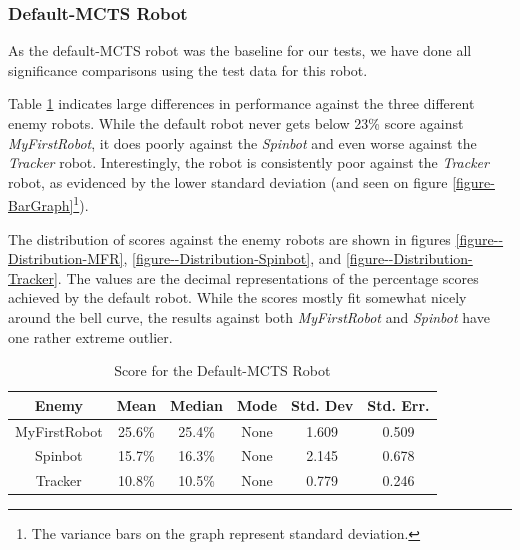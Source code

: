 \subsubsection{Default-MCTS Robot}
As the default-MCTS robot was the baseline for our tests, we have done all significance comparisons using the test data for this robot.

Table \ref{table-default-score} indicates large differences in performance against the three different enemy robots. While the default robot never gets below 23\% score against \textit{MyFirstRobot}, it does poorly against the \textit{Spinbot} and even worse against the \textit{Tracker} robot. Interestingly, the robot is consistently poor against the \textit{Tracker} robot, as evidenced by the lower standard deviation (and seen on figure \ref{figure-BarGraph}\footnote{The variance bars on the graph represent standard deviation.}).

The distribution of scores against the enemy robots are shown in figures \ref{figure--Distribution-MFR}, \ref{figure--Distribution-Spinbot}, and \ref{figure--Distribution-Tracker}. The values are the decimal representations of the percentage scores achieved by the default robot. While the scores mostly fit somewhat nicely around the bell curve, the results against both \textit{MyFirstRobot} and \textit{Spinbot} have one rather extreme outlier.

\begin{table}
\begin{center}
\renewcommand{\arraystretch}{1.3}
\caption{Score for the Default-MCTS Robot}
\label{table-default-score}
\begin{tabular}{|c | c | c |c | c| c |}
\hline
Enemy & Mean & Median & Mode & Std. Dev & Std. Err.\\
\hline
MyFirstRobot & 25.6\% & 25.4\% & None & 1.609 & 0.509\\
\hline
Spinbot & 15.7\% & 16.3\% & None & 2.145 & 0.678 \\
\hline
Tracker & 10.8\% & 10.5\% & None & 0.779 & 0.246 \\
\hline
\end{tabular}
\end{center}
\end{table}

